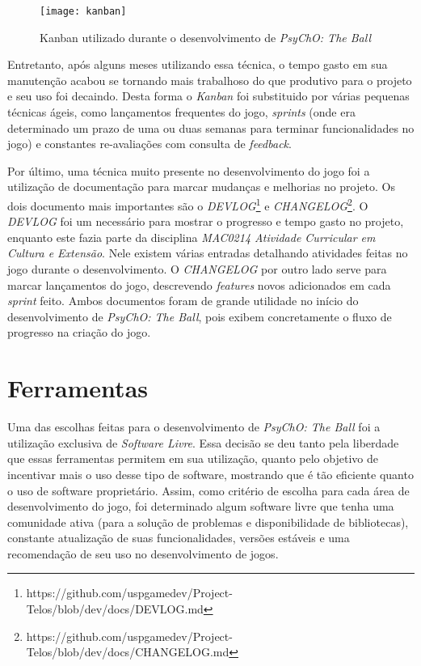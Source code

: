\begin{figure}[h!]
\texttt{[image: kanban]}
\centering
\caption{Kanban utilizado durante o desenvolvimento de \textit{PsyChO: The Ball}}
\end{figure}

Entretanto, após alguns meses utilizando essa técnica, o tempo gasto em sua manutenção acabou se tornando mais trabalhoso do que produtivo para o projeto e seu uso foi decaindo. Desta forma o \textit{Kanban} foi substituido por várias pequenas técnicas ágeis, como lançamentos frequentes do jogo, \textit{sprints} (onde era determinado um prazo de uma ou duas semanas para terminar funcionalidades no jogo) e constantes re-avaliações com consulta de \textit{feedback}.

Por último, uma técnica muito presente no desenvolvimento do jogo foi a utilização de documentação para marcar mudanças e melhorias no projeto. Os dois documento mais importantes são o \textit{DEVLOG}\footnote{https://github.com/uspgamedev/Project-Telos/blob/dev/docs/DEVLOG.md} e \textit{CHANGELOG}\footnote{https://github.com/uspgamedev/Project-Telos/blob/dev/docs/CHANGELOG.md}. O \textit{DEVLOG} foi um necessário para mostrar o progresso e tempo gasto no projeto, enquanto este fazia parte da disciplina \textit{MAC0214 Atividade Curricular em Cultura e Extensão}. Nele existem várias entradas detalhando atividades feitas no jogo durante o desenvolvimento. O \textit{CHANGELOG} por outro lado serve para marcar lançamentos do jogo, descrevendo \textit{features} novos adicionados em cada \textit{sprint} feito. Ambos documentos foram de grande utilidade no início do desenvolvimento de \textit{PsyChO: The Ball}, pois exibem concretamente o fluxo de progresso na criação do jogo.

\section{Ferramentas}
\label{sec:ferramentas}

Uma das escolhas feitas para o desenvolvimento de \textit{PsyChO: The Ball} foi a utilização exclusiva de \textit{Software Livre}. Essa decisão se deu tanto pela liberdade que essas ferramentas permitem em sua utilização, quanto pelo objetivo de incentivar mais o uso desse tipo de software, mostrando que é tão eficiente quanto o uso de software proprietário. Assim, como critério de escolha para cada área de desenvolvimento do jogo, foi determinado algum software livre que tenha uma comunidade ativa (para a solução de problemas e disponibilidade de bibliotecas), constante atualização de suas funcionalidades, versões estáveis e uma recomendação de seu uso no desenvolvimento de jogos.

